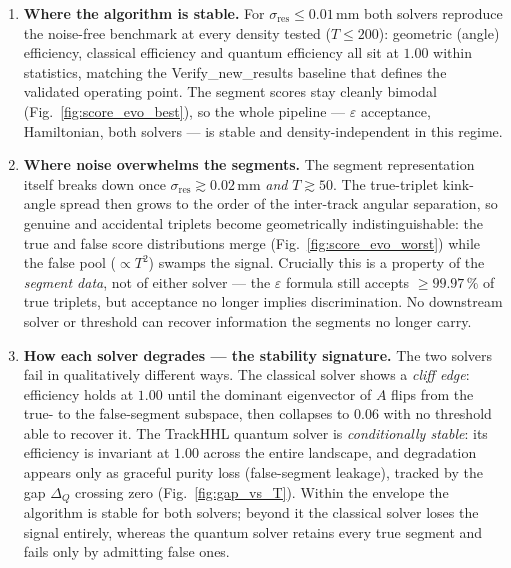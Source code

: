 \documentclass[11pt,a4paper]{article}
\newcommand{\eps}{\varepsilon}
\newcommand{\sres}{\sigma_{\mathrm{res}}}
\newcommand{\ntrk}{T}
\begin{document}
\begin{enumerate}[topsep=2pt]
  \item \textbf{Where the algorithm is stable.}
        For $\sres\leq0.01\,\mathrm{mm}$ both solvers reproduce the noise-free benchmark
        at every density tested ($\ntrk\leq200$): geometric (angle) efficiency, classical
        efficiency and quantum efficiency all sit at $1.00$ within statistics, matching
        the Verify\_new\_results baseline that defines the validated operating point.
        The segment scores stay cleanly bimodal (Fig.~\ref{fig:score_evo_best}), so the
        whole pipeline --- $\eps$ acceptance, Hamiltonian, both solvers --- is stable and
        density-independent in this regime.

  \item \textbf{Where noise overwhelms the segments.}
        The segment representation itself breaks down once
        $\sres\gtrsim0.02\,\mathrm{mm}$ \emph{and} $\ntrk\gtrsim50$. The true-triplet
        kink-angle spread then grows to the order of the inter-track angular separation,
        so genuine and accidental triplets become geometrically indistinguishable: the
        true and false score distributions merge (Fig.~\ref{fig:score_evo_worst}) while
        the false pool ($\propto\ntrk^2$) swamps the signal. Crucially this is a property
        of the \emph{segment data}, not of either solver --- the $\eps$ formula still
        accepts $\geq99.97\,\%$ of true triplets, but acceptance no longer implies
        discrimination. No downstream solver or threshold can recover information the
        segments no longer carry.

  \item \textbf{How each solver degrades --- the stability signature.}
        The two solvers fail in qualitatively different ways. The classical solver shows
        a \emph{cliff edge}: efficiency holds at $1.00$ until the dominant eigenvector of
        $A$ flips from the true- to the false-segment subspace, then collapses to $0.06$
        with no threshold able to recover it. The TrackHHL quantum solver is
        \emph{conditionally stable}: its efficiency is invariant at $1.00$ across the
        entire landscape, and degradation appears only as graceful purity loss
        (false-segment leakage), tracked by the gap $\Delta_Q$ crossing zero
        (Fig.~\ref{fig:gap_vs_T}). Within the envelope the algorithm is stable for both
        solvers; beyond it the classical solver loses the signal entirely, whereas the
        quantum solver retains every true segment and fails only by admitting false ones.
\end{enumerate}
\end{document}
